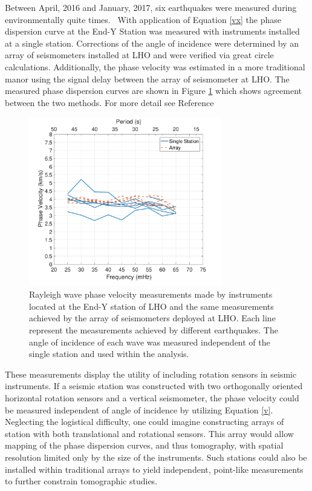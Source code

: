 \documentclass [12pt, proquest]{uwthesis}[2019]
\begin{document}
Between April, 2016 and January, 2017, six earthquakes were measured during environmentally quite times.~\cite{tiltSeismology} With application of Equation \ref{vx} the phase dispersion curve at the End-Y Station was measured with instruments installed at a single station. Corrections of the angle of incidence were determined by an array of seismometers installed at LHO and were verified via great circle calculations. Additionally, the phase velocity was estimated in a more traditional manor using the signal delay between the array of seismometer at LHO. The measured phase dispersion curves are shown in Figure \ref{Phase_Hanford} which shows agreement between the two methods. For more detail see Reference~\cite{tiltSeismology}
 
\begin{figure}%
\begin{center}
\includegraphics[width=0.75\textwidth]{Vel.pdf}
\caption[Single station Rayleigh wave phase velocity measurements]{Rayleigh wave phase velocity measurements made by instruments located at the End-Y station of LHO and the same measurements achieved by the array of seismometers deployed at LHO. Each line represent the measurements achieved by different earthquakes. The angle of incidence of each wave was measured independent of the single station and used within the analysis.~\cite{tiltSeismology}}
\label{Phase_Hanford}
\end{center}
\end{figure}

These measurements display the utility of including rotation sensors in seismic instruments. If a seismic station was constructed with two orthogonally oriented horizontal rotation sensors and a vertical seismometer, the phase velocity could be measured independent of angle of incidence by utilizing Equation \ref{v}. Neglecting the logistical difficulty, one could imagine constructing arrays of station with both translational and rotational sensors. This array would allow mapping of the phase dispersion curves, and thus tomography, with spatial resolution limited only by the size of the instruments. Such stations could also be installed within traditional arrays to yield independent, point-like measurements to further constrain tomographic studies.
\end{document}
